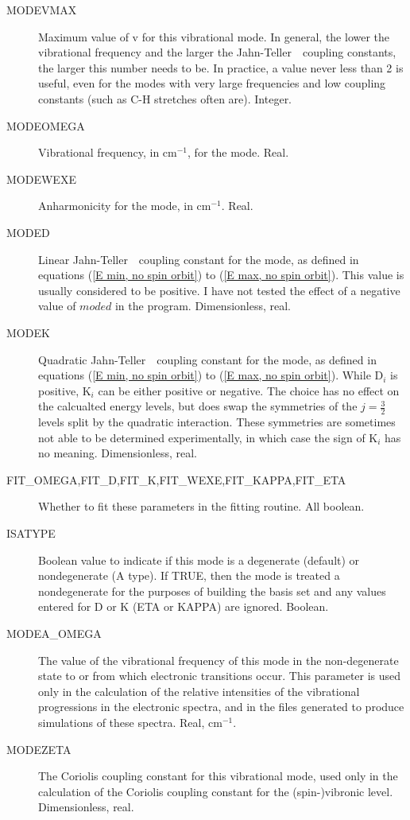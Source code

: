 \documentclass{article}
\newcommand{\wn}{cm$^{-1}$}
\newcommand{\JT}{Jahn-Teller\ }
\begin{document}
\begin{description}

\item[MODEVMAX] Maximum value of v for this vibrational mode. In
  general, the lower the vibrational frequency and the larger the \JT\
  coupling constants, the larger this number needs to be. In practice,
  a value never less than 2 is useful, even for the modes with very
  large frequencies and low coupling constants (such as C-H stretches
  often are). Integer.

\item[MODEOMEGA] Vibrational frequency, in \wn , for the mode. Real.

\item[MODEWEXE] Anharmonicity for the mode, in \wn . Real.

\item[MODED] Linear \JT\ coupling constant for the mode, as defined in
  equations (\ref{E min, no spin orbit}) to (\ref{E max, no spin
    orbit}). This value is usually considered to be positive. I have
  not tested the effect of a negative value of $moded$ in the
  program. Dimensionless, real.

\item[MODEK] Quadratic \JT\ coupling constant for the mode, as
  defined in equations (\ref{E min, no spin orbit}) to (\ref{E max, no spin
    orbit}). While D$_i$ is positive, K$_i$ can be either positive or
  negative. The choice has no effect on the calcualted energy levels,
  but does swap the symmetries of the $j=\frac{3}{2}$ levels split by
  the quadratic interaction. These symmetries are sometimes not able to be
  determined experimentally, in which case the sign of K$_i$ has
  no meaning. Dimensionless, real.

\item[FIT\_OMEGA,FIT\_D,FIT\_K,FIT\_WEXE,FIT\_KAPPA,FIT\_ETA] Whether to fit these
  parameters in the fitting routine.  All boolean.
  
\item[ISATYPE] Boolean value to indicate if this mode is a degenerate (default) or
  nondegenerate (A type). If TRUE, then the mode is treated a nondegenerate for the purposes
  of building the basis set and any values entered for D or K (ETA or KAPPA) are ignored. Boolean.

\item[MODEA\_OMEGA] The value of the vibrational frequency of this
  mode in the non-degenerate state to or from which electronic
  transitions occur. This parameter is used only in the calculation of
  the relative intensities of the vibrational progressions in the
  electronic spectra, and in the files generated to produce
  simulations of these spectra. Real, \wn .

\item[MODEZETA] The Coriolis coupling constant for this vibrational
  mode, used only in the calculation of the Coriolis coupling constant
  for the (spin-)vibronic level. Dimensionless, real.

\end{description}
\end{document}
